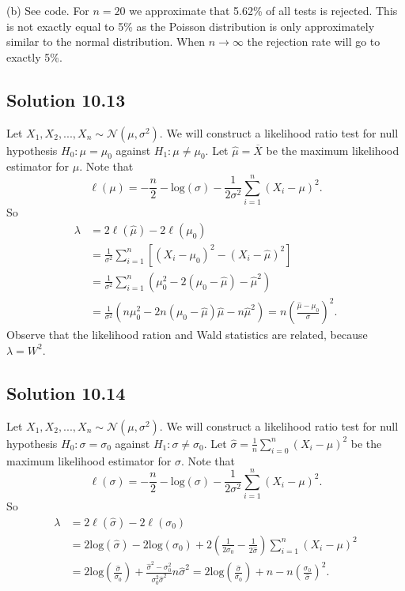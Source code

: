 (b) See code.
For $n = 20$ we approximate that 5.62\% of all tests is rejected.
This is not exactly equal to 5\% as the Poisson distribution is only approximately similar to the normal distribution.
When $n \to \infty$ the rejection rate will go to exactly 5\%.


\subsection*{Solution 10.13}

Let $X_1, X_2, ..., X_n \sim \mathcal{N}(\mu, \sigma^2)$.
We will construct a likelihood ratio test for null hypothesis $H_0: \mu = \mu_0$ against $H_1: \mu \neq \mu_0$.
Let $\hat{\mu} = \overline{X}$ be the maximum likelihood estimator for $\mu$.
Note that
$$
\ell(\mu) = -\frac{n}{2} - \mathrm{log}(\sigma) - \frac{1}{2\sigma^2} \sum_{i=1}^n (X_i - \mu)^2.
$$
So
\begin{equation*}
\begin{split}
\lambda &= 2\ell(\hat{\mu}) - 2\ell(\mu_0) \\
    &= \frac{1}{\sigma^2} \sum_{i=1}^n \left[ (X_i - \mu_0)^2 - (X_i - \hat{\mu})^2 \right] \\
    &= \frac{1}{\sigma^2} \sum_{i=1}^n (\mu_0^2 - 2(\mu_0 - \hat{\mu}) - \hat{\mu}^2) \\
    &= \frac{1}{\sigma^2} (n\mu_0^2 - 2n(\mu_0 - \hat{\mu})\hat{\mu} - n\hat{\mu}^2)
    = n \left(\frac{\hat{\mu} - \mu_0}{\sigma}\right)^2.
\end{split}
\end{equation*}
Observe that the likelihood ration and Wald statistics are related, because $\lambda = W^2$.


\subsection*{Solution 10.14}

Let $X_1, X_2, ..., X_n \sim \mathcal{N}(\mu, \sigma^2)$.
We will construct a likelihood ratio test for null hypothesis $H_0: \sigma = \sigma_0$ against $H_1: \sigma \neq \sigma_0$.
Let $\hat{\sigma} = \frac{1}{n}\sum_{i=0}^n (X_i - \mu)^2$ be the maximum likelihood estimator for $\sigma$.
Note that
$$
\ell(\sigma) = -\frac{n}{2} - \mathrm{log}(\sigma) - \frac{1}{2\sigma^2} \sum_{i=1}^n (X_i - \mu)^2.
$$
So
\begin{equation*}
\begin{split}
\lambda &= 2\ell(\hat{\sigma}) - 2\ell(\sigma_0) \\
    &= 2\mathrm{log}(\hat{\sigma}) - 2\mathrm{log}(\sigma_0) + 2\left(\frac{1}{2\sigma_0} - \frac{1}{2\hat{\sigma}}\right) \sum_{i=1}^n (X_i - \mu)^2 \\
    &= 2\mathrm{log}\left(\frac{\hat{\sigma}}{\sigma_0}\right) + \frac{\hat{\sigma}^2 - \sigma_0^2}{\sigma_0^2 \hat{\sigma}^2} n \hat{\sigma}^2
    = 2\mathrm{log}\left(\frac{\hat{\sigma}}{\sigma_0}\right) + n - n\left(\frac{\sigma_0}{\hat{\sigma}}\right)^2.
\end{split}
\end{equation*}
